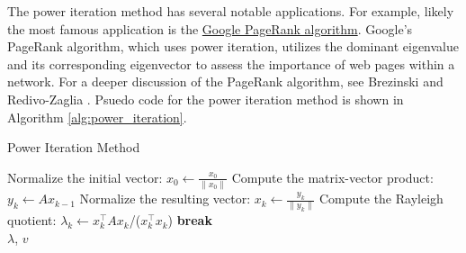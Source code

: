 \documentclass{article}[11pt]
\begin{document}
The power iteration method has several notable applications. For example, likely the most famous application is the \href{https://en.wikipedia.org/wiki/PageRank}{Google PageRank algorithm}.
Google's PageRank algorithm, which uses power iteration, utilizes the dominant eigenvalue and its corresponding eigenvector to assess the importance of web pages within a network.
For a deeper discussion of the PageRank algorithm, see Brezinski and Redivo-Zaglia \citep{Brezinski:2006}. Psuedo code for the power iteration method is shown in Algorithm \ref{alg:power_iteration}.
\begin{algorithm}[H]
   \caption{Power Iteration Method}\label{alg:power_iteration}
\begin{algorithmic}[1]
   
   \State Normalize the initial vector: $x_0 \leftarrow \frac{x_0}{\|x_0\|}$
       \State Compute the matrix-vector product: $y_k \leftarrow A x_{k-1}$
       \State Normalize the resulting vector: $x_k \leftarrow \frac{y_k}{\|y_k\|}$
       \State Compute the Rayleigh quotient: $\lambda_k \leftarrow x_k^\top A x_k$/($x_k^\top x_k$)
           \State \textbf{break}
       \EndIf
   \EndFor
   \\
   \Return $\lambda$, $v$
   \end{algorithmic}
\end{algorithm}
\end{document}
